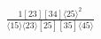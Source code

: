 \documentclass[varwidth, border=5pt]{standalone}
\begin{document}
\begin{my}
$\begin{gathered}
\scriptscriptstyle\frac{1[23][34]⟨25⟩^2}{⟨15⟩⟨23⟩[25][35]⟨45⟩}
\end{gathered}$
\end{my}
\end{document}
